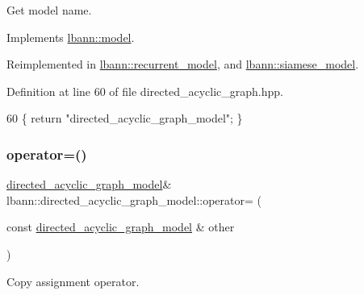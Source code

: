 Get model name. 

Implements \hyperlink{classlbann_1_1model_a7e471599eded909c4ce7178689dd13b6}{lbann\+::model}.



Reimplemented in \hyperlink{classlbann_1_1recurrent__model_a01b4f6dce63bc2e0545b2bd7603b32b2}{lbann\+::recurrent\+\_\+model}, and \hyperlink{classlbann_1_1siamese__model_ad745961977aa395e11543d263103126e}{lbann\+::siamese\+\_\+model}.



Definition at line 60 of file directed\+\_\+acyclic\+\_\+graph.\+hpp.


\begin{DoxyCode}
60 \{ \textcolor{keywordflow}{return} \textcolor{stringliteral}{"directed\_acyclic\_graph\_model"}; \}
\end{DoxyCode}
\mbox{\label{classlbann_1_1directed__acyclic__graph__model_a683d794c5d87534d9c5c3cbba814e199}} 
\subsubsection{\texorpdfstring{operator=()}{operator=()}}
{\footnotesize\ttfamily \hyperlink{classlbann_1_1directed__acyclic__graph__model}{directed\+\_\+acyclic\+\_\+graph\+\_\+model}\& lbann\+::directed\+\_\+acyclic\+\_\+graph\+\_\+model\+::operator= (\begin{DoxyParamCaption}\item[{const \hyperlink{classlbann_1_1directed__acyclic__graph__model}{directed\+\_\+acyclic\+\_\+graph\+\_\+model} \&}]{other }\end{DoxyParamCaption})\hspace{0.3cm}{\ttfamily [default]}}

Copy assignment operator. \mbox{\label{classlbann_1_1directed__acyclic__graph__model_a2a70d5719832c481db9fa962f6e5f2bd}} 
